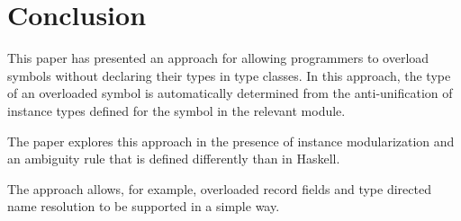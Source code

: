 \section{Conclusion}
\label{sec:conclusion}

This paper has presented an approach for allowing programmers to
overload symbols without declaring their types in type classes. In
this approach, the type of an overloaded symbol is automatically
determined from the anti-unification of instance types defined for the
symbol in the relevant module.

The paper explores this approach in the presence of instance
modularization and an ambiguity rule that is defined differently than
in Haskell.

The approach allows, for example, overloaded record fields and type
directed name resolution to be supported in a simple way.



